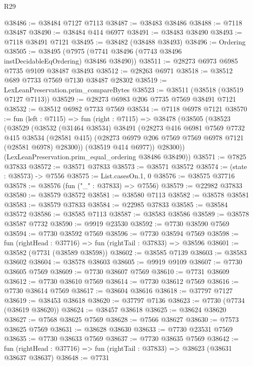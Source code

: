 \begin{lexlean}{R29}
\begin{coremodule}
@38486 := @38484 @7127 @7113
@38487 := @38483 @38486
@38488 := @7118 @38487
@38490 := @38484 @414 @6977
@38491 := @38483 @38490
@38493 := @7118 @38491 @7121
@38495 := @38482 (@38488 @38493)
@38496 := Ordering
@38505 := @38495 (@7975 (@7741 @38496 (@7743 @38496 instDecidableEqOrdering) @38486 @38490))
@38511 := @28273 @6973 @6985 @7735 @9109 @38487 @38493
@38512 := @28263 @6971
@38518 := @38512 @689 @7733 @7569 @7130 @38487 @28302
@38519 := LexLeanPreservation.prim_compareBytes
@38523 := @38511 (@38518 (@38519 @7127 @7113))
@38529 := @28273 @6983 @206 @7735 @7569 @38491 @7121
@38532 := @38512 @6982 @7733 @7569
@38534 := @7118 @6978 @7121
@38570 := fun (left : @7115) =>
  fun (right : @7115) =>
  @38478
    (@38505
      (@38523
        (@38529
          (@38532
            (@31464 @38534)
            @38491
            (@28273
              @416
              @6981
              @7569
              @7732
              @415
              @38534
              (@28581 @415)
              (@28273 @6979 @206 @7569 @7569 @6978 @7121 (@28581 @6978) @28300))
            (@38519 @414 @6977))
          @28300))
      (LexLeanPreservation.prim_equal_ordering @38486 @38490))
@38571 := @7825 @37833
@38572 := @38571 @37833
@38573 := @38571 @38572
@38574 := (state : @38573) -> @7556
@38575 := List.casesOn.{1, 0}
@38576 := @38575 @37716
@38578 := @38576 (fun ("_" : @37833) => @7556)
@38579 := @22982 @37833
@38580 := @38579 @38572
@38581 := @38580 @7113
@38582 := @38578 @38581
@38583 := @38579 @37833
@38584 := @22985 @37833
@38585 := @38584 @38572
@38586 := @38585 @7113
@38587 := @38583 @38586
@38589 := @38578 @38587 @7732
@38590 := @9919 @23530
@38592 := @7730 @38590 @7569
@38594 := @7730 @38592 @7569
@38596 := @7730 @38594 @7569
@38598 := fun (rightHead : @37716) => fun (rightTail : @37833) => @38596
@38601 := @38582 (@7731 (@38589 @38598))
@38602 := @38585 @7139
@38603 := @38583 @38602
@38604 := @38578 @38603
@38605 := @9919 @9109
@38607 := @7730 @38605 @7569
@38609 := @7730 @38607 @7569
@38610 := @7731 @38609
@38612 := @7730 @38610 @7569
@38614 := @7730 @38612 @7569
@38616 := @7730 @38614 @7569
@38617 := @38604 @38616
@38618 := @37797 @7127
@38619 := @38453 @38618
@38620 := @37797 @7136
@38623 := @7730 (@7734 (@38619 @38620))
@38624 := @38457 @38618
@38625 := @38624 @38620
@38627 := @7568 @38625 @7569
@38628 := @7566 @38627
@38630 := @7573 @38625 @7569
@38631 := @38628 @38630
@38633 := @7730 @23531 @7569
@38635 := @7730 @38633 @7569
@38637 := @7730 @38635 @7569
@38642 := fun (rightHead : @37716) => fun (rightTail : @37833) => @38623 (@38631 @38637 @38637)
@38648 := @7731

\end{coremodule}
\end{lexlean}
